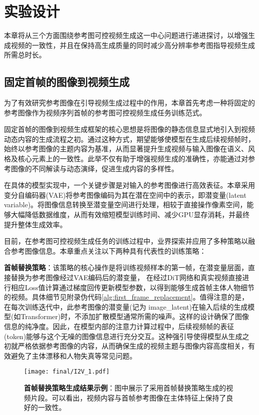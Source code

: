\cleardoublepage

\section{实验设计}
本章将从三个方面围绕参考图可控视频生成这一中心问题进行递进探讨，以增强生成视频的一致性，并且在保持高生成质量的同时减少高分辨率参考图指导视频生成所需总时长。
\subsection{固定首帧的图像到视频生成}\label{sec1}
为了有效研究参考图像在引导视频生成过程中的作用，本章首先考虑一种将固定的参考图像作为视频序列首帧的参考图可控视频生成任务训练范式。

固定首帧的图像到视频生成框架的核心思想是将图像的静态信息显式地引入到视频动态内容的生成流程之初。通过这种方式，期望能够使模型在生成后续视频帧时，始终以参考图像的主题内容为基准，从而显著提升生成视频与输入图像在语义、风格及核心元素上的一致性。此举不仅有助于增强视频生成的准确性，亦能通过对参考图像的不同解读与动态演绎，促进生成内容的多样性。

在具体的模型实现中，一个关键步骤是对输入的参考图像进行高效表征。本章采用变分自编码器(VAE)将参考图像编码为其在潜在空间中的表示，即潜变量(latent variable)。将图像信息转换至潜变量空间进行处理，相较于直接操作像素空间，能够大幅降低数据维度，从而有效缩短模型训练时间、减少GPU显存消耗，并最终提升整体生成效率。

目前，在参考图可控视频生成任务的训练过程中，业界探索并应用了多种策略以融合参考图像信息。本章重点关注以下两种具有代表性的训练策略：

\textbf{首帧替换策略}：该策略的核心操作是将训练视频样本的第一帧，在潜变量层面，直接替换为参考图像经过VAE编码后的潜变量， 在经过DiT网络和真实视频直接进行相应Loss值计算通过梯度回传更新模型参数，以得到能够生成首帧主体人物细节的视频。具体细节见附录伪代码\ref{alg:first_frame_replacement}。值得注意的是，在每次训练迭代中，此参考图像的潜变量(记为 image\_latent)在输入后续的生成模型(如Transformer)时，不添加扩散模型通常所需的噪声。这样的设计确保了图像信息的纯净度。因此，在模型内部的注意力计算过程中，后续视频帧的表征(token)能够与这个无噪的图像信息进行充分交互。这种强引导使得模型从生成之初就严格依据参考图像的内容，从而确保生成的视频主题与图像内容高度相关，有效避免了主体漂移和人物失真等常见问题。
 

\begin{figure}[htbp]
    \centering
    \texttt{[image: final/I2V\_1.pdf]}
    \caption{\textbf{首帧替换策略生成结果示例}：图中展示了采用首帧替换策略生成的视频片段。可以看出，视频内容与首帧参考图像在主体特征上保持了良好的一致性。}
    \label{I2V_1}
\end{figure}

